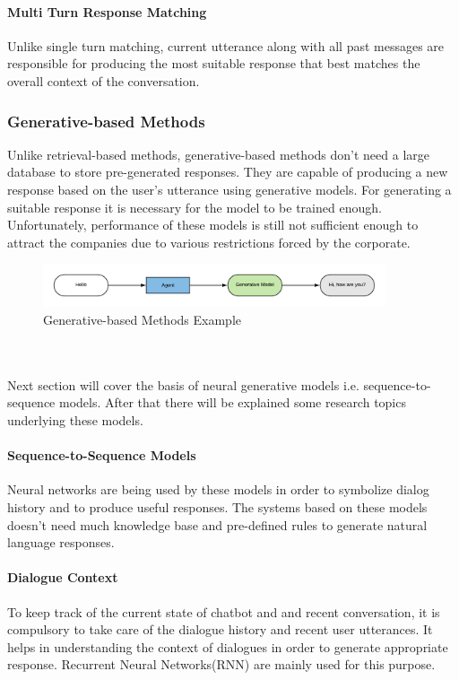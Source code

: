 \paragraph*{Multi Turn Response Matching}
Unlike single turn matching, current utterance along with all past messages are responsible for producing the most suitable response that best matches the overall context of the conversation. \cite{surveyondialogsystems}

\subsubsection*{Generative-based Methods}
Unlike retrieval-based methods, generative-based methods don't need a large database to store pre-generated responses. They are capable of producing a new response based on the user's utterance using generative models. For generating a suitable response it is necessary for the model to be trained enough. Unfortunately, performance of these models is still not sufficient enough to attract the companies due to various restrictions forced by the corporate. \cite{designandimplementation} 

\begin{figure}[h]
    \centering
    \includegraphics[width=0.9\textwidth]{img/Generative_based.pdf}
    \caption{Generative-based Methods Example \cite{designandimplementation}}
    \label{fig:ann}
\end{figure}
\\~\\
Next section will cover the basis of neural generative models i.e. sequence-to-sequence models. After that there will be explained some research topics underlying these models. 

\paragraph*{Sequence-to-Sequence Models}
Neural networks are being used by these models in order to symbolize dialog history and to produce useful responses. The systems based on these models doesn't need much knowledge base and pre-defined rules to generate natural language responses. \cite{surveyondialogsystems}

\paragraph*{Dialogue Context}
To keep track of the current state of chatbot and and recent conversation, it is compulsory to take care of the dialogue history and recent user utterances. It helps in understanding the context of dialogues in order to generate appropriate response. Recurrent Neural Networks(RNN) are mainly used for this purpose. \cite{surveyondialogsystems}

